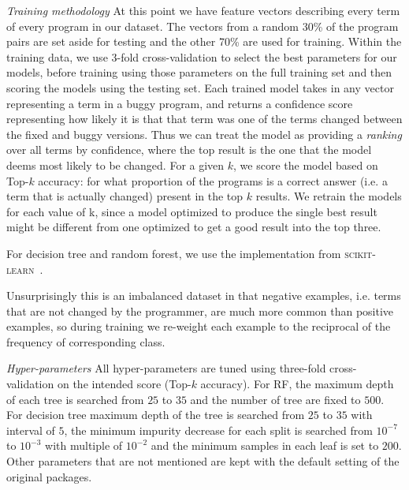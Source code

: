 \documentclass[conference]{IEEEtran}
\begin{document}
\emph{Training methodology}
At this point we have feature vectors describing every term of every program in
our dataset. The vectors from a random 30\% of the program pairs are set aside for testing and
the other 70\% are used for training.
Within the training data, we use 3-fold
cross-validation to select the best parameters for our models, before training
using those parameters on the full training set and then scoring the models
using the testing set.
Each trained model takes in any vector representing a term
in a buggy program, and returns a confidence score representing how likely it is that
that term was one of the terms changed between the fixed and buggy versions.
Thus we can treat the model as providing a \emph{ranking} over all terms by
confidence, where the top result is the one that the model deems most likely
to be changed.
For a given $k$, we score the model based on Top-$k$ accuracy: for what
proportion of the programs is a correct answer (i.e. a term that is actually
changed) present in the top $k$ results.
We retrain the models for each value of k, since a model optimized to produce
the single best result might be different from one optimized to get a good
result into the top three.

For decision tree and random forest, we use the implementation from
\textsc{scikit-learn}~\cite{scikit-learn}.

Unsurprisingly this is an imbalanced dataset in that negative examples, i.e.
terms that are not changed by the programmer, are much more common than
positive examples, so during training we re-weight each example to the reciprocal
of the frequency of corresponding class.

\emph{Hyper-parameters}
All hyper-parameters are tuned using three-fold cross-validation on the
intended score (Top-$k$ accuracy).
For RF, the maximum depth of each tree is searched from $25$ to $35$ and the
number of tree are fixed to $500$.
For decision tree maximum depth of the tree is searched from $25$ to $35$ with interval of $5$,
the minimum impurity decrease for each split is searched from $10^{-7}$ to
$10^{-3}$ with multiple of $10^{-2}$ and the minimum samples in each leaf is set to $200$.
Other parameters that are not mentioned are kept with the default setting of the
original packages.
\end{document}
